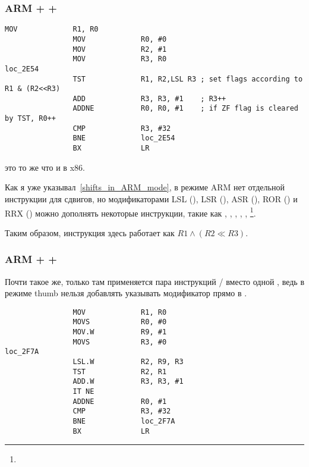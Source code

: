 \subsubsection{ARM + \OptimizingXcode + \ARMMode}

\begin{lstlisting}[caption=\OptimizingXcode + \ARMMode]
                MOV             R1, R0
                MOV             R0, #0
                MOV             R2, #1
                MOV             R3, R0
loc_2E54
                TST             R1, R2,LSL R3 ; set flags according to R1 & (R2<<R3)
                ADD             R3, R3, #1    ; R3++
                ADDNE           R0, R0, #1    ; if ZF flag is cleared by TST, R0++
                CMP             R3, #32
                BNE             loc_2E54
                BX              LR
\end{lstlisting}

 это то же что и \TEST в x86.

Как я уже указывал~\ref{shifts_in_ARM_mode}, в режиме ARM нет отдельной инструкции для сдвигов, 
но модификаторами 
LSL (), 
LSR (), 
ASR (), 
ROR () и 
RRX () можно дополнять некоторые инструкции, такие как \MOV, ,
\CMP, \ADD, \SUB, \footnote{\DataProcessingFunctionsFootNote}.

Таким образом, инструкция  здесь работает как $R1 \land (R2 \ll R3)$.

\subsubsection{ARM + \OptimizingXcode + \ThumbTwoMode}

Почти такое же, только там применяется пара инструкций / вместо одной ,
ведь в режиме thumb нельзя добавлять указывать модификатор  прямо в .

\begin{lstlisting}
                MOV             R1, R0
                MOVS            R0, #0
                MOV.W           R9, #1
                MOVS            R3, #0
loc_2F7A
                LSL.W           R2, R9, R3
                TST             R2, R1
                ADD.W           R3, R3, #1
                IT NE
                ADDNE           R0, #1
                CMP             R3, #32
                BNE             loc_2F7A
                BX              LR
\end{lstlisting}

